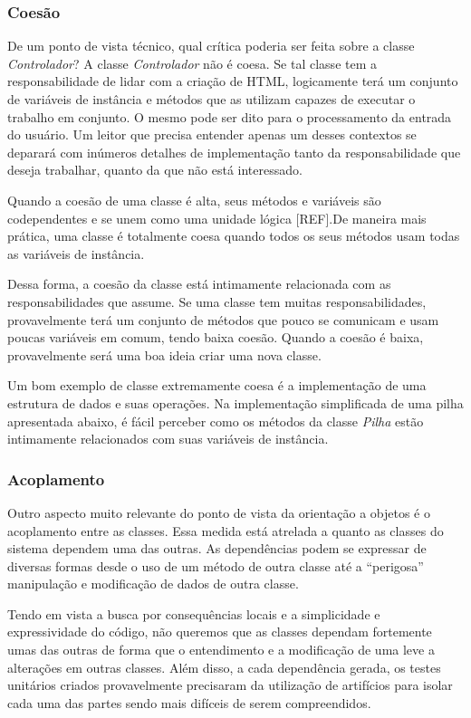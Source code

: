 \subsubsection{Coesão}
De um ponto de vista técnico, qual crítica poderia ser feita sobre a classe \textit{Controlador}? 
A classe \textit{Controlador} não é coesa. Se tal classe tem a responsabilidade de lidar com a criação de HTML, logicamente terá um conjunto de variáveis de instância e métodos que as utilizam capazes de executar o trabalho em conjunto. O mesmo pode ser dito para o processamento da entrada do usuário. Um leitor que precisa entender apenas um desses contextos se deparará com inúmeros detalhes de implementação tanto da responsabilidade que deseja trabalhar, quanto da que não está interessado.
	
Quando a coesão de uma classe é alta, seus métodos e variáveis são codependentes e se unem como uma unidade lógica [REF].De maneira mais prática, uma classe é totalmente coesa quando todos os seus métodos usam todas as variáveis de instância.
	
Dessa forma, a coesão da classe está intimamente relacionada com as responsabilidades que assume. Se uma classe tem muitas responsabilidades, provavelmente terá um conjunto de métodos que pouco se comunicam e usam poucas variáveis em comum, tendo baixa coesão. Quando a coesão é baixa, provavelmente será uma boa ideia criar uma nova classe.

Um bom exemplo de classe extremamente coesa é a implementação de uma estrutura de dados e suas operações. Na implementação simplificada de uma pilha apresentada abaixo, é fácil perceber como os métodos da classe \textit{Pilha} estão intimamente relacionados com suas variáveis de instância.



\subsubsection{Acoplamento}
Outro aspecto muito relevante do ponto de vista da orientação a objetos é o acoplamento entre as classes. Essa medida 
está atrelada a quanto as classes do sistema dependem uma das outras. As dependências podem se expressar de diversas 
formas desde o uso de um método de outra classe até a ``perigosa'' manipulação e modificação de dados de outra classe.
	
Tendo em vista a busca por consequências locais e a simplicidade e expressividade do código, não queremos que as 
classes dependam fortemente umas das outras de forma que o entendimento e a modificação de uma leve a alterações em 
outras classes. Além disso, a cada dependência gerada, os testes unitários criados provavelmente precisaram da 
utilização de artifícios para isolar cada uma das partes sendo mais difíceis de serem compreendidos.

